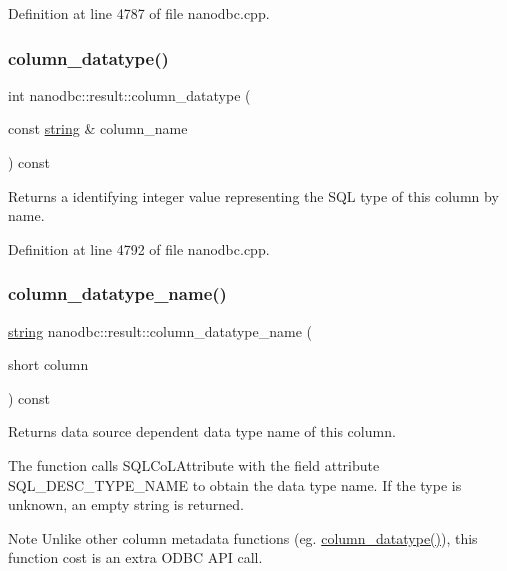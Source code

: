 Definition at line 4787 of file nanodbc.\+cpp.

\mbox{\label{classnanodbc_1_1result_af698d05f12656b6ab0809b0a60ea9a60}} 
\subsubsection{\texorpdfstring{column\_datatype()}{column\_datatype()}\hspace{0.1cm}{\footnotesize\ttfamily [2/2]}}
{\footnotesize\ttfamily int nanodbc\+::result\+::column\+\_\+datatype (\begin{DoxyParamCaption}\item[{const \mbox{\hyperlink{namespacenanodbc_abfc0ece56278e590911ec8352774c212}{string}} \&}]{column\+\_\+name }\end{DoxyParamCaption}) const}



Returns a identifying integer value representing the S\+QL type of this column by name. 



Definition at line 4792 of file nanodbc.\+cpp.

\mbox{\label{classnanodbc_1_1result_a72775ba759833560efebba44892576b3}} 
\subsubsection{\texorpdfstring{column\_datatype\_name()}{column\_datatype\_name()}\hspace{0.1cm}{\footnotesize\ttfamily [1/2]}}
{\footnotesize\ttfamily \mbox{\hyperlink{namespacenanodbc_abfc0ece56278e590911ec8352774c212}{string}} nanodbc\+::result\+::column\+\_\+datatype\+\_\+name (\begin{DoxyParamCaption}\item[{short}]{column }\end{DoxyParamCaption}) const}



Returns data source dependent data type name of this column. 

The function calls S\+Q\+L\+Co\+L\+Attribute with the field attribute S\+Q\+L\+\_\+\+D\+E\+S\+C\+\_\+\+T\+Y\+P\+E\+\_\+\+N\+A\+ME to obtain the data type name. If the type is unknown, an empty string is returned. \begin{DoxyNote}{Note}
Unlike other column metadata functions (eg. \mbox{\hyperlink{classnanodbc_1_1result_a8adc601a07a055f15908724e285133bb}{column\+\_\+datatype()}}), this function cost is an extra O\+D\+BC A\+PI call. 
\end{DoxyNote}


